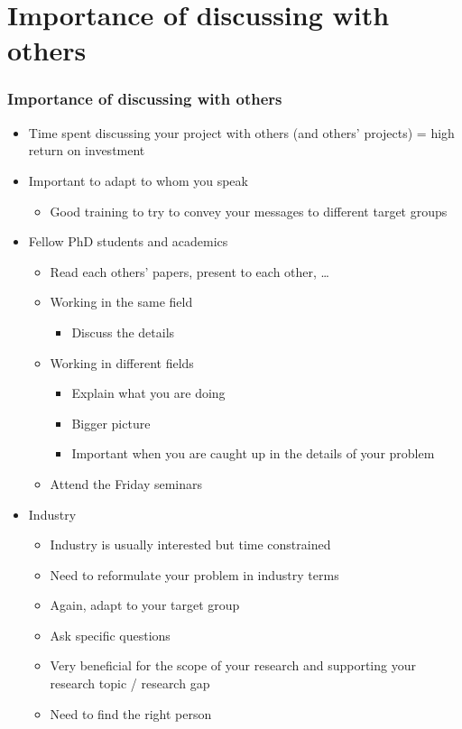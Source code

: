 \documentclass[screen, aspectratio=43]{beamer}
\begin{document}
\section{Importance of discussing with others}

\begin{frame}
  \frametitle{Importance of discussing with others}
  \begin{itemize}
  \item Time spent discussing your project with others (and others' projects) = high return on investment
  \item Important to adapt to whom you speak
    \begin{itemize}[<only@1>]
    \item Good training to try to convey your messages to different target groups
    \end{itemize}
  \item Fellow PhD students and academics
    \begin{itemize}[<only@2>]
    \item Read each others' papers, present to each other, \ldots
    \item Working in the same field
      \begin{itemize}
      \item Discuss the details
      \end{itemize}
    \item Working in different fields
      \begin{itemize}
      \item Explain what you are doing
      \item Bigger picture
      \item Important when you are caught up in the details of your problem
      \end{itemize}
    \item Attend the Friday seminars \smiley{}
    \end{itemize}
  \item Industry
    \begin{itemize}[<only@3>]
    \item Industry is usually interested but time constrained
    \item Need to reformulate your problem in industry terms
    \item Again, adapt to your target group
    \item Ask specific questions
    \item Very beneficial for the scope of your research and supporting your research topic / research gap
    \item Need to find the right person
    \end{itemize}
  \end{itemize}
\end{frame}
\end{document}
